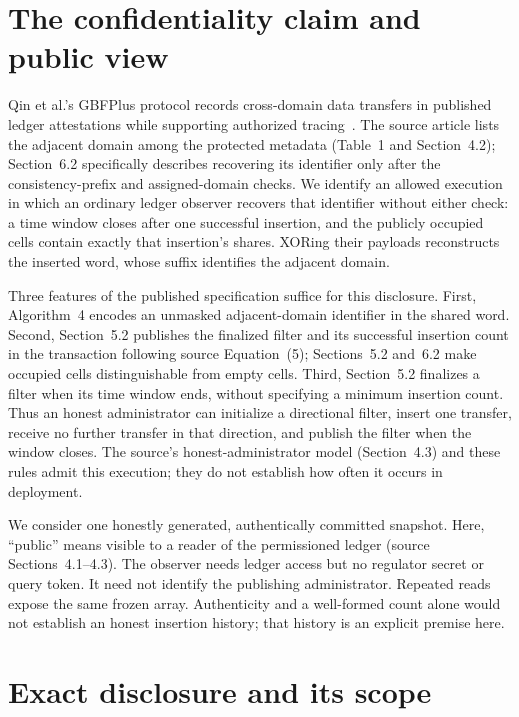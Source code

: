 \section{The confidentiality claim and public view}

Qin et al.'s GBFPlus protocol records cross-domain data transfers in published
ledger attestations while supporting authorized tracing~\cite{qin2026gbfplus}.
The source article lists the adjacent domain among the protected metadata
(Table~1 and Section~4.2); Section~6.2 specifically describes recovering its
identifier only after the consistency-prefix and assigned-domain checks.
We identify an allowed execution in which an ordinary ledger observer recovers
that identifier without either check: a time window closes after one successful
insertion, and the publicly occupied cells contain exactly that insertion's
shares. XORing their payloads reconstructs the inserted word, whose suffix
identifies the adjacent domain.

Three features of the published specification suffice for this disclosure.
First, Algorithm~4 encodes an unmasked adjacent-domain identifier in the shared
word. Second, Section~5.2 publishes the finalized filter and its successful
insertion count in the transaction following source Equation~(5); Sections~5.2
and~6.2 make occupied cells distinguishable from empty cells. Third,
Section~5.2 finalizes a filter when its time window ends, without specifying
a minimum insertion count. Thus an honest administrator can initialize a
directional filter, insert one transfer, receive no further transfer in that
direction, and publish the filter when the window closes. The source's
honest-administrator model (Section~4.3) and these rules admit this execution;
they do not establish how often it occurs in deployment.

We consider one honestly generated, authentically committed snapshot.
Here, ``public'' means visible to a reader of the permissioned ledger (source
Sections~4.1--4.3). The observer needs ledger access but no regulator secret
or query token. It need not identify the publishing administrator. Repeated
reads expose the same frozen array. Authenticity and a well-formed count
alone would not establish an honest insertion history; that history is an
explicit premise here.

\section{Exact disclosure and its scope}

